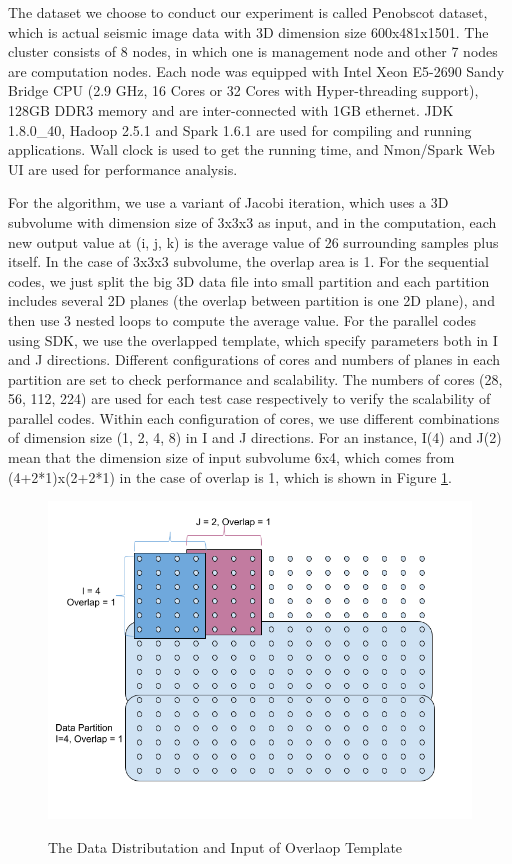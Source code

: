 The dataset we choose to conduct our experiment is called Penobscot dataset, which is actual seismic image data with 3D dimension size 600x481x1501. 
The cluster consists of 8 nodes, in which one is management node and other 7 nodes are computation nodes. Each node was equipped with Intel Xeon E5-2690 Sandy Bridge CPU (2.9 GHz, 16 Cores or 32 Cores with Hyper-threading support), 128GB DDR3 memory and are inter-connected with 1GB ethernet. 
JDK 1.8.0\_40, Hadoop 2.5.1 and Spark 1.6.1 are used for compiling and running applications. Wall clock is used to get the running time, and Nmon/Spark Web UI are used for performance analysis.

For the algorithm, we use a variant of Jacobi iteration, which uses a 3D subvolume with dimension size of 3x3x3 as input, and in the computation, each new output value at (i, j, k) is the average value of 26 surrounding samples plus itself. In the case of 3x3x3 subvolume, the overlap area is 1. 
For the sequential codes, we just split the big 3D data file into small partition and each partition includes several 2D planes (the overlap between partition is one 2D plane), and then use 3 nested loops to compute the average value. 
For the parallel codes using SDK, we use the overlapped template, which specify parameters both in I and J directions. 
Different configurations of cores and numbers of planes in each partition are set to check performance and scalability. 
The numbers of cores (28, 56, 112, 224) are used for each test case respectively to verify the scalability of parallel codes. 
Within each configuration of cores, we use different combinations of dimension size (1, 2, 4, 8) in I and J directions. For an instance, I(4) and J(2) mean that the dimension size of input subvolume 6x4, which comes from (4+2*1)x(2+2*1) in the case of overlap is 1, which is shown in Figure \ref{StencilData}.

\begin{figure}[h]
\centering
\includegraphics[scale=0.5]{figures/StencilData.png}\\
\caption{The Data Distributation and Input of Overlaop Template}
\label{StencilData}
\end{figure}

